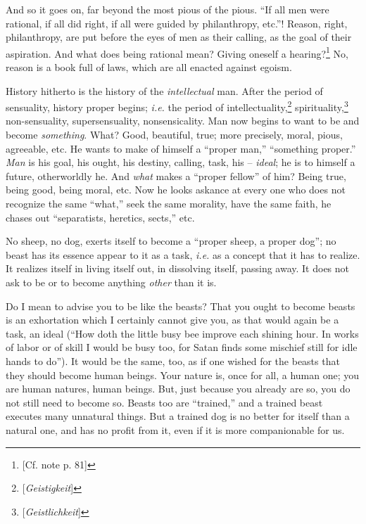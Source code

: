 \documentclass[12pt,a4paper]{book}
\begin{document}
And so it goes on, far beyond the most pious of the pious. ``If all men were 
rational, if all did right, if all were guided by philanthropy, etc.''! 
Reason, right, philanthropy, are put before the eyes of men as their calling, 
as the goal of their aspiration. And what does being rational mean? Giving 
oneself a hearing?\footnote{[Cf. note p. 81]} No, reason is a book full of 
laws, which are all enacted against egoism.

History hitherto is the history of the \textit{intellectual} man. After the 
period of sensuality, history proper begins; \textit{i.e.} the period of 
intellectuality,\footnote{[\textit{Geistigkeit}]} 
spirituality,\footnote{[\textit{Geistlichkeit}]} non-sensuality, 
supersensuality, nonsensicality. Man now begins to want to be and become 
\textit{something}. What? Good, beautiful, true; more precisely, moral, pious, 
agreeable, etc. He wants to make of himself a ``proper man,'' ``something 
proper.'' \textit{Man} is his goal, his ought, his destiny, calling, task, 
his -- \textit{ideal}; he is to himself a future, otherworldly he. And 
\textit{what} makes a ``proper fellow'' of him? Being true, being good, 
being moral, etc. Now he looks askance at every one who does not recognize the 
same ``what,'' seek the same morality, have the same faith, he chases out 
``separatists, heretics, sects,'' etc.

No sheep, no dog, exerts itself to become a ``proper sheep, a proper dog''; 
no beast has its essence appear to it as a task, \textit{i.e.} as a concept 
that it has to realize. It realizes itself in living itself out, in dissolving 
itself, passing away. It does not ask to be or to become anything 
\textit{other} than it is.

Do I mean to advise you to be like the beasts? That you ought to become beasts 
is an exhortation which I certainly cannot give you, as that would again be a 
task, an ideal (``How doth the little busy bee improve each shining hour. In 
works of labor or of skill I would be busy too, for Satan finds some mischief 
still for idle hands to do''). It would be the same, too, as if one wished 
for the beasts that they should become human beings. Your nature is, once for 
all, a human one; you are human natures, human beings. But, just because you 
already are so, you do not still need to become so. Beasts too are 
``trained,'' and a trained beast executes many unnatural things. But a 
trained dog is no better for itself than a natural one, and has no profit from 
it, even if it is more companionable for us.
\end{document}
